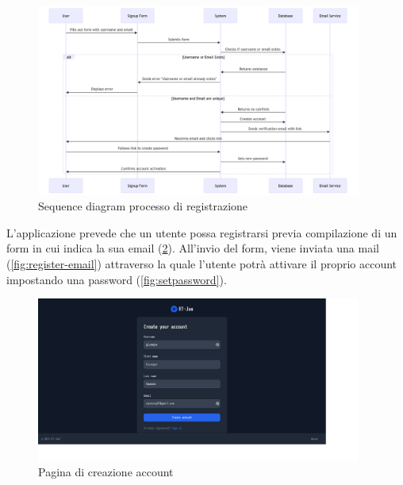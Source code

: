 \documentclass{article}
\begin{document}
\begin{figure}[h]
  \begin{center}
    \includegraphics[width=0.95\textwidth]{figures/sq_registration.png}
  \end{center}
  \caption{Sequence diagram processo di registrazione}\label{fig:registration-process}
\end{figure}

L'applicazione prevede che un utente possa registrarsi previa compilazione di un form in 
cui indica la sua email (\cref{fig:sign-up-page}). 
All'invio del form, viene inviata una mail (\cref{fig:register-email})
attraverso la quale l'utente potrà attivare il proprio account impostando una password
(\cref{fig:setpassword}). 

\begin{figure}[h]
  \begin{center}
    \includegraphics[width=0.95\textwidth]{figures/register_page.png}
  \end{center}
  \caption{Pagina di creazione account}\label{fig:sign-up-page}
\end{figure}
\end{document}

